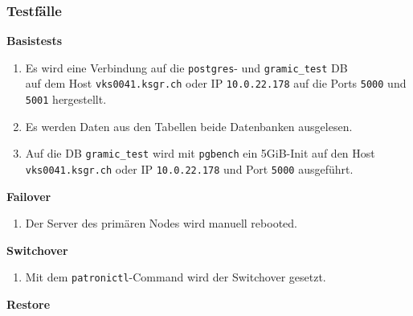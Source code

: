 
\begin{flushleft}
    \subsubsection{Testfälle}
    \begin{description}
        \item \textbf{Basistests}\hfill \\
        \begin{enumerate}
            \item Es wird eine Verbindung auf die \texttt{postgres}- und \texttt{gramic\_test} DB\\ auf dem Host \texttt{vks0041.ksgr.ch} oder IP \texttt{10.0.22.178} auf die Ports \texttt{5000} und \texttt{5001} hergestellt.
            \item Es werden Daten aus den Tabellen beide Datenbanken ausgelesen.
            \item Auf die DB \texttt{gramic\_test} wird mit \texttt{pgbench} ein 5GiB-Init auf den Host \texttt{vks0041.ksgr.ch} oder IP \texttt{10.0.22.178} und Port \texttt{5000} ausgeführt.
        \end{enumerate}
        \item \textbf{Failover}\hfill \\
        \begin{enumerate}[resume]
            \item Der Server des primären Nodes wird manuell rebooted.
        \end{enumerate}
        \item \textbf{Switchover}\hfill \\
        \begin{enumerate}[resume]
            \item Mit dem \texttt{patronictl}-Command wird der Switchover gesetzt.
        \end{enumerate}
        \item \textbf{Restore}\hfill \\

\end{description}
\end{flushleft}
